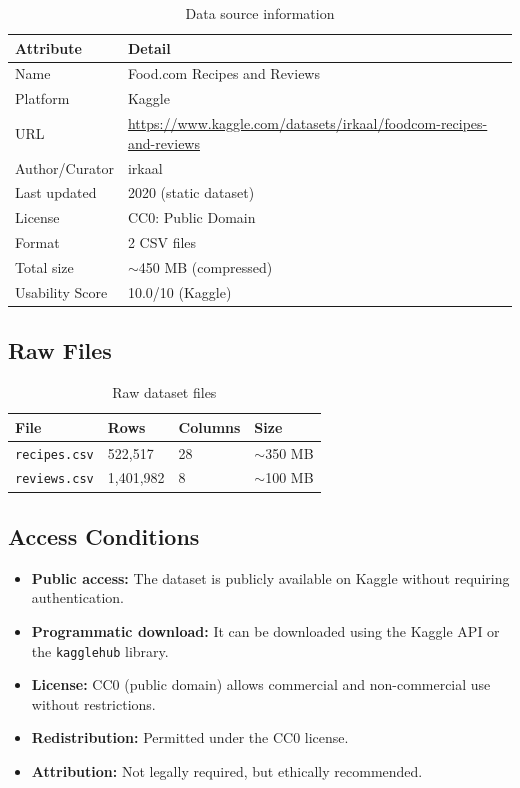 \documentclass[11pt,a4paper]{article}
\begin{document}
\begin{table}[H]
\centering
\begin{tabular}{ll}
\toprule
\textbf{Attribute} & \textbf{Detail} \\
\midrule
Name & Food.com Recipes and Reviews \\
Platform & Kaggle \\
URL & \url{https://www.kaggle.com/datasets/irkaal/foodcom-recipes-and-reviews} \\
Author/Curator & irkaal \\
Last updated & 2020 (static dataset) \\
License & CC0: Public Domain \\
Format & 2 CSV files \\
Total size & $\sim$450 MB (compressed) \\
Usability Score & 10.0/10 (Kaggle) \\
\bottomrule
\end{tabular}
\caption{Data source information}
\label{tab:source}
\end{table}

\subsection{Raw Files}

\begin{table}[H]
\centering
\begin{tabular}{llll}
\toprule
\textbf{File} & \textbf{Rows} & \textbf{Columns} & \textbf{Size} \\
\midrule
\texttt{recipes.csv} & 522,517 & 28 & $\sim$350 MB \\
\texttt{reviews.csv} & 1,401,982 & 8 & $\sim$100 MB \\
\bottomrule
\end{tabular}
\caption{Raw dataset files}
\label{tab:raw_files}
\end{table}

\subsection{Access Conditions}

\begin{itemize}
    \item \textbf{Public access:} The dataset is publicly available on Kaggle without requiring authentication.
    \item \textbf{Programmatic download:} It can be downloaded using the Kaggle API or the \texttt{kagglehub} library.
    \item \textbf{License:} CC0 (public domain) allows commercial and non-commercial use without restrictions.
    \item \textbf{Redistribution:} Permitted under the CC0 license.
    \item \textbf{Attribution:} Not legally required, but ethically recommended.
\end{itemize}
\end{document}
